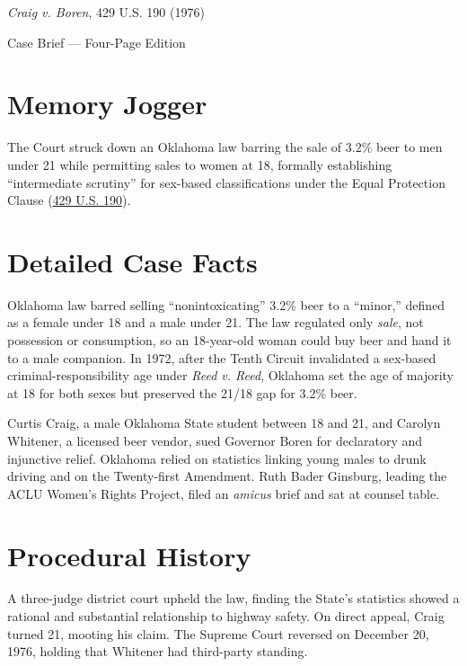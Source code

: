 \documentclass[12pt]{article}
\begin{document}
\begin{center}
{\LARGE \textit{Craig v. Boren}, 429 U.S. 190 (1976)\par}
\vspace{0.8em}
{\large Case Brief --- Four-Page Edition\par}
\end{center}
\vspace{1em}

\section{Memory Jogger}

The Court struck down an Oklahoma law barring the sale of 3.2\% beer to men under 21 while permitting sales to women at 18, formally establishing ``intermediate scrutiny'' for sex-based classifications under the Equal Protection Clause (\href{https://supreme.justia.com/cases/federal/us/429/190/}{429 U.S. 190}).

\section{Detailed Case Facts}

Oklahoma law barred selling ``nonintoxicating'' 3.2\% beer to a ``minor,'' defined as a female under 18 and a male under 21. The law regulated only \textit{sale}, not possession or consumption, so an 18-year-old woman could buy beer and hand it to a male companion. In 1972, after the Tenth Circuit invalidated a sex-based criminal-responsibility age under \textit{Reed v. Reed}, Oklahoma set the age of majority at 18 for both sexes but preserved the 21/18 gap for 3.2\% beer.

Curtis Craig, a male Oklahoma State student between 18 and 21, and Carolyn Whitener, a licensed beer vendor, sued Governor Boren for declaratory and injunctive relief. Oklahoma relied on statistics linking young males to drunk driving and on the Twenty-first Amendment. Ruth Bader Ginsburg, leading the ACLU Women's Rights Project, filed an \textit{amicus} brief and sat at counsel table.

\section{Procedural History}

A three-judge district court upheld the law, finding the State's statistics showed a rational and substantial relationship to highway safety. On direct appeal, Craig turned 21, mooting his claim. The Supreme Court reversed on December 20, 1976, holding that Whitener had third-party standing.
\end{document}
